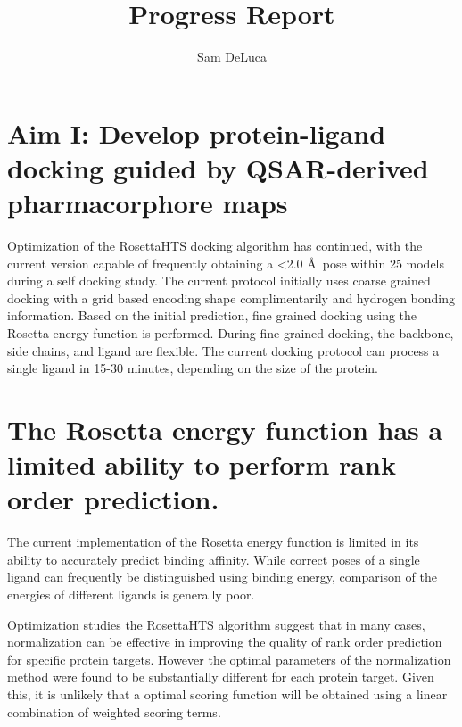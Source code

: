 \documentclass[11pt, oneside]{article}   	%
\title{Progress Report}
\author{Sam DeLuca}
\begin{document}
\maketitle
\section{Aim I: Develop protein-ligand docking guided by QSAR-derived pharmacorphore maps}
Optimization of the RosettaHTS docking algorithm has continued, with the current version capable of frequently obtaining a \textless 2.0 \AA\ pose within 25 models during a self docking study.
The current protocol initially uses coarse grained docking with a grid based encoding shape complimentarily and hydrogen bonding information.  
Based on the initial prediction, fine grained docking using the Rosetta energy function is performed.  
During fine grained docking, the backbone, side chains, and ligand are flexible. 
The current docking protocol can process a single ligand in 15-30 minutes, depending on the size of the protein.

\section{The Rosetta energy function has a limited ability to perform rank order prediction.}
The current implementation of the Rosetta energy function is limited in its ability to accurately predict binding affinity.
While correct poses of a single ligand can frequently be distinguished using binding energy\citep{Davis:2009fx}, comparison of the energies of different ligands is generally poor\citep{Kaufmann:2009cq}.

Optimization studies the RosettaHTS algorithm suggest that in many cases, normalization can be effective in improving the quality of rank order prediction for specific protein targets.  
However the optimal parameters of the normalization method were found to be substantially different for each protein target.  
Given this, it is unlikely that a optimal scoring function will be obtained using a linear combination of weighted scoring terms. 
\end{document}
